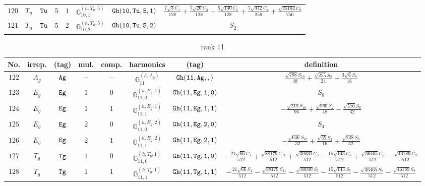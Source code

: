 \documentclass[fleqn,8pt]{jsarticle}
\begin{document}
\begin{table}[ht!]
\begin{center}
\begin{tabular}{cccccccc}
$ 120 $ & $ T_{u} $ & $ {\tt Tu} $ & $ 5 $ & $ 1 $ & $ \mathbb{G}_{10,1}^{(h,T_{u},5)} $ & $ {\tt Gh(10,Tu,5,1)} $ & $ \frac{7 \sqrt{3} C_{1}}{128} + \frac{7 \sqrt{26} C_{3}}{128} + \frac{5 \sqrt{130} C_{5}}{128} + \frac{7 \sqrt{442} C_{7}}{256} + \frac{\sqrt{25194} C_{9}}{256} $ \\
$ 121 $ & $ T_{u} $ & $ {\tt Tu} $ & $ 5 $ & $ 2 $ & $ \mathbb{G}_{10,2}^{(h,T_{u},5)} $ & $ {\tt Gh(10,Tu,5,2)} $ & $ S_{2} $ \\
 \hline \hline
\end{tabular}
\end{center}
\end{table}
\begin{table}[ht!]
\begin{center}
\caption{rank 11}
\renewcommand{\arraystretch}{1.3}
\begin{tabular}{cccccccc} \hline \hline
No. & irrep. & (tag) & mul. & comp. & harmonics & (tag) & definition \\ \hline
$ 122 $ & $ A_{g} $ & $ {\tt Ag} $ & $ - $ & $ - $ & $ \mathbb{G}_{11}^{(h,A_{g})} $ & $ {\tt Gh(11,Ag,,)} $ & $ \frac{\sqrt{798} S_{10}}{48} + \frac{\sqrt{255} S_{2}}{24} + \frac{3 \sqrt{6} S_{6}}{16} $ \\
$ 123 $ & $ E_{g} $ & $ {\tt Eg} $ & $ 1 $ & $ 0 $ & $ \mathbb{G}_{11,0}^{(h,E_{g},1)} $ & $ {\tt Gh(11,Eg,1,0)} $ & $ S_{8} $ \\
$ 124 $ & $ E_{g} $ & $ {\tt Eg} $ & $ 1 $ & $ 1 $ & $ \mathbb{G}_{11,1}^{(h,E_{g},1)} $ & $ {\tt Gh(11,Eg,1,1)} $ & $ - \frac{\sqrt{210} S_{10}}{96} + \frac{\sqrt{969} S_{2}}{48} - \frac{\sqrt{570} S_{6}}{32} $ \\
$ 125 $ & $ E_{g} $ & $ {\tt Eg} $ & $ 2 $ & $ 0 $ & $ \mathbb{G}_{11,0}^{(h,E_{g},2)} $ & $ {\tt Gh(11,Eg,2,0)} $ & $ S_{4} $ \\
$ 126 $ & $ E_{g} $ & $ {\tt Eg} $ & $ 2 $ & $ 1 $ & $ \mathbb{G}_{11,1}^{(h,E_{g},2)} $ & $ {\tt Gh(11,Eg,2,1)} $ & $ - \frac{\sqrt{646} S_{10}}{32} + \frac{\sqrt{35} S_{2}}{16} + \frac{\sqrt{238} S_{6}}{32} $ \\
$ 127 $ & $ T_{g} $ & $ {\tt Tg} $ & $ 1 $ & $ 0 $ & $ \mathbb{G}_{11,0}^{(h,T_{g},1)} $ & $ {\tt Gh(11,Tg,1,0)} $ & $ - \frac{21 \sqrt{66} C_{1}}{512} + \frac{\sqrt{88179} C_{11}}{512} + \frac{\sqrt{30030} C_{3}}{512} - \frac{15 \sqrt{143} C_{5}}{512} + \frac{\sqrt{36465} C_{7}}{512} - \frac{\sqrt{46189} C_{9}}{512} $ \\
$ 128 $ & $ T_{g} $ & $ {\tt Tg} $ & $ 1 $ & $ 1 $ & $ \mathbb{G}_{11,1}^{(h,T_{g},1)} $ & $ {\tt Gh(11,Tg,1,1)} $ & $ - \frac{21 \sqrt{66} S_{1}}{512} - \frac{\sqrt{88179} S_{11}}{512} - \frac{\sqrt{30030} S_{3}}{512} - \frac{15 \sqrt{143} S_{5}}{512} - \frac{\sqrt{36465} S_{7}}{512} - \frac{\sqrt{46189} S_{9}}{512} $ \\

\end{tabular}
\end{center}
\end{table}
\end{document}

